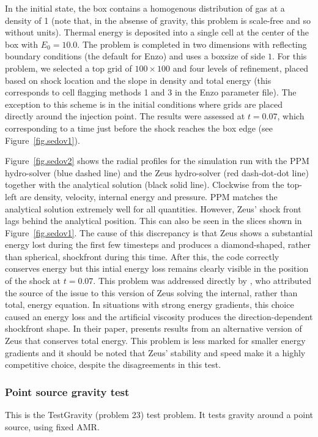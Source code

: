 In the initial state, the box contains a homogenous distribution of
gas at a density of 1 (note that, in the absense of gravity, this
problem is scale-free and so without units). Thermal energy is
deposited into a single cell at the center of the box with $E_0 =
10.0$. The problem is completed in two dimensions with reflecting
boundary conditions (the default for Enzo) and uses a boxsize of side
$1$. For this problem, we selected a top grid of $100 \times 100$ and
four levels of refinement, placed based on shock location and the
slope in density and total energy (this corresponds to cell flagging
methods 1 and 3 in the Enzo parameter file). The exception to this
scheme is in the initial conditions where grids are placed directly
around the injection point. The results were assessed at $t = 0.07$,
which corresponding to a time just before the shock reaches the box
edge (see Figure~\ref{fig.sedov1}).

Figure~\ref{fig.sedov2} shows the radial profiles for the simulation
run with the PPM hydro-solver (blue dashed line) and the Zeus
hydro-solver (red dash-dot-dot line) together with the analytical
solution (black solid line). Clockwise from the top-left are density,
velocity, internal energy and pressure. PPM matches the analytical
solution extremely well for all quantities. However, Zeus' shock front
lags behind the analytical position. This can also be seen in the
slices shown in Figure~\ref{fig.sedov1}. The cause of this discrepancy
is that Zeus shows a substantial energy lost during the first few
timesteps and produces a diamond-shaped, rather than spherical,
shockfront during this time. After this, the code correctly conserves
energy but this intial energy loss remains clearly visible in the
position of the shock at $t = 0.07$. This problem was addressed
directly by \citet{Clarke2010}, who attributed the source of the issue
to this version of Zeus solving the internal, rather than total,
energy equation. In situations with strong energy gradients, this
choice caused an energy loss and the artificial viscosity produces the
direction-dependent shockfront shape. In their paper,
\citet{Clarke2010} presents results from an alternative version of
Zeus that conserves total energy. This problem is less marked for
smaller energy gradients and it should be noted that Zeus' stability
and speed make it a highly competitive choice, despite the
disagreements in this test.


\subsubsection{Point source gravity test}
\label{sec.test.gravitypointsource}
This is the TestGravity (problem 23) test problem.  It tests gravity around a point source, using fixed AMR.

